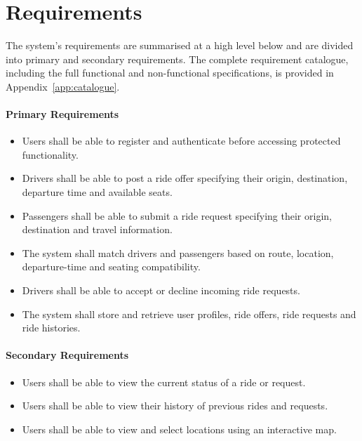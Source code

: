 \section{Requirements}

The system's requirements are summarised at a high level below and are divided into primary and secondary requirements. The complete requirement catalogue, including the full functional and non-functional specifications, is provided in Appendix~\ref{app:catalogue}.

\paragraph{Primary Requirements}
\begin{itemize}
  \item Users shall be able to register and authenticate before accessing protected functionality.
  \item Drivers shall be able to post a ride offer specifying their origin, destination, departure time and available seats.
  \item Passengers shall be able to submit a ride request specifying their origin, destination and travel information.
  \item The system shall match drivers and passengers based on route, location, departure-time and seating compatibility.
  \item Drivers shall be able to accept or decline incoming ride requests.
  \item The system shall store and retrieve user profiles, ride offers, ride requests and ride histories.
\end{itemize}

\paragraph{Secondary Requirements}
\begin{itemize}
  \item Users shall be able to view the current status of a ride or request.
  \item Users shall be able to view their history of previous rides and requests.
  \item Users shall be able to view and select locations using an interactive map.
\end{itemize}
